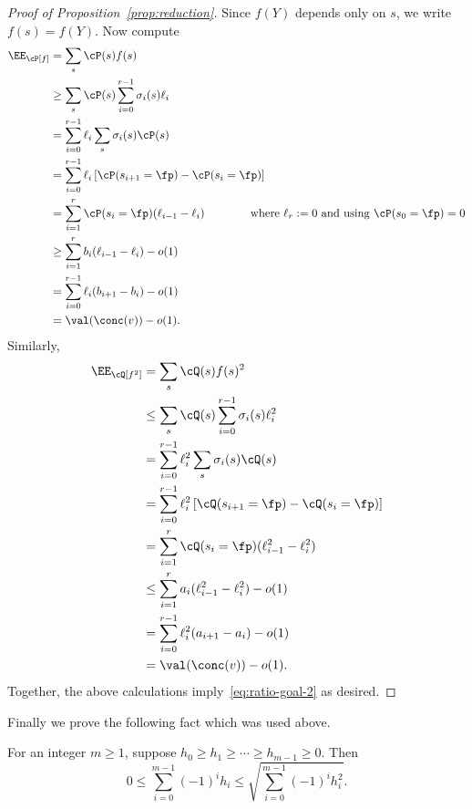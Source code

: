 \documentclass[11pt]{article}
\begin{document}
\begin{proof}[Proof of Proposition~\ref{prop:reduction}]
Since $f(Y)$ depends only on $s$, we write $f(s) = f(Y)$. Now compute
\begin{align*}
\EE_\cP[f] &= \sum_s \cP(s) f(s) \\
&\ge \sum_s \cP(s) \sum_{i=0}^{r-1} \sigma_i(s) \ell_i \\
&= \sum_{i=0}^{r-1} \ell_i \sum_s \sigma_i(s) \cP(s) \\
&= \sum_{i=0}^{r-1} \ell_i \, [\cP(s_{i+1} = \fp) - \cP(s_i = \fp)] \\
&= \sum_{i=1}^r \cP(s_i = \fp) (\ell_{i-1} - \ell_i) \qquad\qquad \text{where } \ell_r := 0 \text{ and using } \cP(s_0 = \fp) = 0 \\
&\ge \sum_{i=1}^r b_i (\ell_{i-1} - \ell_i) - o(1) \\
&= \sum_{i=0}^{r-1} \ell_i (b_{i+1} - b_i) - o(1) \\
&= \val(\conc(v)) - o(1).
\end{align*}
Similarly,
\begin{align*}
\EE_\cQ[f^2] &= \sum_s \cQ(s) f(s)^2 \\
&\le \sum_s \cQ(s) \sum_{i=0}^{r-1} \sigma_i(s) \ell_i^2 \\
&= \sum_{i=0}^{r-1} \ell_i^2 \sum_s \sigma_i(s) \cQ(s) \\
&= \sum_{i=0}^{r-1} \ell_i^2 \, [\cQ(s_{i+1} = \fp) - \cQ(s_i = \fp)] \\
&= \sum_{i=1}^r \cQ(s_i = \fp) (\ell_{i-1}^2 - \ell_i^2) \\
&\le \sum_{i=1}^r a_i (\ell_{i-1}^2 - \ell_i^2) - o(1) \\
&= \sum_{i=0}^{r-1} \ell_i^2 (a_{i+1} - a_i) - o(1) \\
&= \val(\conc(v)) - o(1).
\end{align*}
Together, the above calculations imply~\eqref{eq:ratio-goal-2} as desired.
\end{proof}

Finally we prove the following fact which was used above.

\begin{lemma}\label{lem:alt-sum}
For an integer $m \ge 1$, suppose $h_0 \ge h_1 \ge \cdots \ge h_{m-1} \ge 0$. Then
\[ 0 \le \sum_{i=0}^{m-1} (-1)^i h_i \le \sqrt{\sum_{i=0}^{m-1} (-1)^i h_i^2}. \]
\end{lemma}
\end{document}
